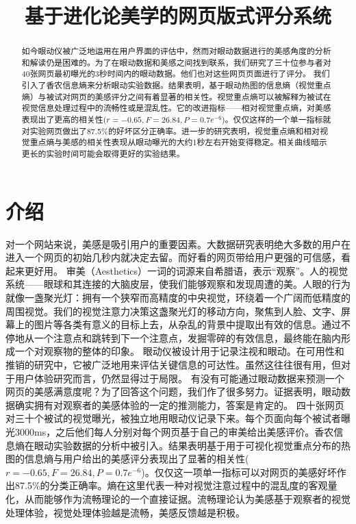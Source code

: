 \documentclass[master, fontset=mac, openany, oneside, zihao=-4]{sjtuthesis}
\begin{document}
\title{基于进化论美学的网页版式评分系统}


\begin{abstract}

如今眼动仪被广泛地运用在用户界面的评估中，然而对眼动数据进行的美感角度的分析和解读仍是困难的。为了在眼动数据和美感之间找到联系，我们研究了三十位参与者对40张网页最初曝光的3秒时间内的眼动数据。他们也对这些网页页面进行了评分。 我们引入了香农信息熵来分析眼动实验数据。结果表明，基于眼动热图的信息熵（视觉重点熵）与被试对网页的美感评分之间有着显著的相关性。视觉重点熵可以被解释为被试在视觉信息处理过程中的流畅性或是混乱性。它的改进指标——相对视觉重点熵，对美感表现出了更高的相关性($r=-0.65, F=26.84, P=0.7e^{-6}$)。仅仅这样的一个单一指标就对实验网页做出了87.5\%的好坏区分正确率。进一步的研究表明，视觉重点熵和相对视觉重点熵与美感的相关性表现从眼动曝光的大约1秒左右开始变得稳定。相关曲线暗示更长的实验时间可能会取得更好的实验结果。

\end{abstract}
\clearpage

\mainmatter	%
\section{介绍}

对一个网站来说，美感是吸引用户的重要因素。大数据研究表明绝大多数的用户在进入一个网页的初始几秒内就决定去留。而好看的网页带给用户更强的可信感，看起来更好用。 审美（Aesthetics）一词的词源来自希腊语，表示“观察”。人的视觉系统——眼球和其连接的大脑皮层，使我们能够观察和发现周遭的美。人眼的行为就像一盏聚光灯：拥有一个狭窄而高精度的中央视觉，环绕着一个广阔而低精度的周围视觉。我们的视觉注意力决策这盏聚光灯的移动方向，聚焦到人脸、文字、屏幕上的图片等各类有意义的目标上去，从杂乱的背景中提取出有效的信息。通过不停地从一个注意点和跳转到下一个注意点，发掘零碎的有效信息，最终能在脑内形成一个对观察物的整体的印象。 眼动仪被设计用于记录注视和眼动。在可用性和推销的研究中，它被广泛地用来评估关键信息的可达性。虽然这往往很有用，但对于用户体验研究而言，仍然显得过于局限。 有没有可能通过眼动数据来预测一个网页的美感满意度呢？为了回答这个问题，我们作了很多努力。证据表明，眼动数据确实拥有对观察者的美感体验的一定的推测能力，答案是肯定的。 四十张网页对三十个被试的视觉曝光，被独立地用眼动仪记录下来。每个页面向每个被试者曝光3000ms，之后他们每人分别对每个网页基于自己的审美给出美感评价。香农信息熵在眼动实验数据的分析中被引入。结果表明基于用于可视化视觉重点分布的热图的信息熵与用户给出的美感评分表现出了显著的相关性($r=-0.65, F=26.84, P=0.7e^{-6}$)。仅仅这一项单一指标可以对网页的美感好坏作出87.5\%的分类正确率。熵在这里代表一种对视觉注意过程中的混乱度的客观量化，从而能够作为流畅理论的一个直接证据。流畅理论认为美感基于观察者的视觉处理体验，视觉处理体验越是流畅，美感反馈越是积极。
\end{document}
